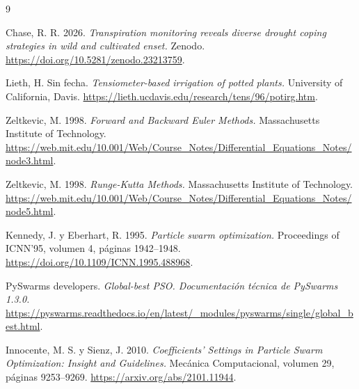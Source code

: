 \documentclass[12pt]{article}
\begin{document}
\begin{thebibliography}{9}
\setlength{\itemsep}{0.3em}
\small
\raggedright

Chase, R. R. 2026. \textit{Transpiration monitoring reveals diverse drought coping strategies in wild and cultivated enset.} Zenodo. \url{https://doi.org/10.5281/zenodo.23213759}.

Lieth, H. Sin fecha. \textit{Tensiometer-based irrigation of potted plants.} University of California, Davis. \url{https://lieth.ucdavis.edu/research/tens/96/potirg.htm}.

Zeltkevic, M. 1998. \textit{Forward and Backward Euler Methods.} Massachusetts Institute of Technology. \url{https://web.mit.edu/10.001/Web/Course_Notes/Differential_Equations_Notes/node3.html}.

Zeltkevic, M. 1998. \textit{Runge-Kutta Methods.} Massachusetts Institute of Technology. \url{https://web.mit.edu/10.001/Web/Course_Notes/Differential_Equations_Notes/node5.html}.

Kennedy, J. y Eberhart, R. 1995. \textit{Particle swarm optimization.} Proceedings of ICNN'95, volumen 4, páginas 1942--1948. \url{https://doi.org/10.1109/ICNN.1995.488968}.

PySwarms developers. \textit{Global-best PSO. Documentación técnica de PySwarms 1.3.0.} \url{https://pyswarms.readthedocs.io/en/latest/_modules/pyswarms/single/global_best.html}.

Innocente, M. S. y Sienz, J. 2010. \textit{Coefficients' Settings in Particle Swarm Optimization: Insight and Guidelines.} Mecánica Computacional, volumen 29, páginas 9253--9269. \url{https://arxiv.org/abs/2101.11944}.

\end{thebibliography}
\end{document}
